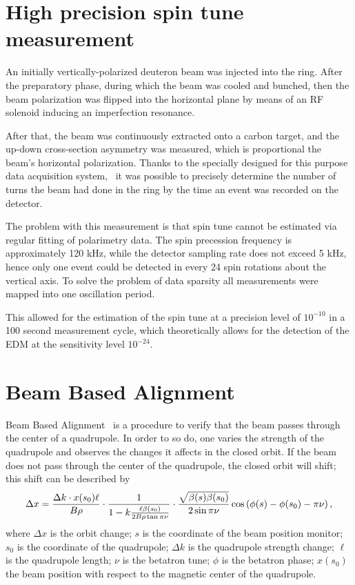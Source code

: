 

\section{High precision spin tune measurement}
An initially vertically-polarized deuteron beam was injected into the ring. After the preparatory phase, during which the beam was cooled and bunched, then the beam polarization was flipped into the horizontal plane by means of an RF solenoid inducing an imperfection resonance.~\cite[p.~7]{COSY:SpinTuneMapping}

After that, the beam was continuously extracted onto a carbon target, and the up-down cross-section asymmetry was measured, which is proportional the beam's horizontal polarization. Thanks to the specially designed for this purpose data acquisition system,~\cite{COSY:DAQ} it was possible to precisely determine the number of turns the beam had done in the ring by the time an event was recorded on the detector.

The problem with this measurement is that spin tune cannot be estimated via regular fitting of polarimetry data.
The spin precession frequency is approximately 120 kHz, while the detector sampling rate does not exceed 5 kHz, hence only one event could be detected in every 24 spin rotations about the vertical axis.
To solve the problem of data sparsity all measurements were mapped into one oscillation period.~\cite{Eversmann:SpinTuneMeasurement}

This allowed for the estimation of the spin tune at a precision level of $10^{-10}$ in a 100 second measurement cycle, which theoretically allows for the detection of the EDM at the sensitivity level $10^{-24}$\ecm.

\section{Beam Based Alignment}
\newcommand{\Nbpm}{N_{\mathrm{BPM}}}
Beam Based Alignment~\cite{Wagner:BBA2018} is a procedure to verify 
that the beam passes through the center of a quadrupole.
In order to so do, one varies the strength of the quadrupole and observes the changes it affects in the 
closed orbit. If the beam does not pass through the center of the quadrupole, the closed orbit will shift;
this shift can be described by
\[
\Delta x = \frac{\Delta k\cdot x(s_0)\ell}{B\rho}\cdot \frac{1}{1 - k\frac{\ell\beta(s_0)}{2B\rho\tan\pi\nu}}\cdot \frac{\sqrt{\beta(s)\beta(s_0)}}{2\sin\pi\nu}\cos\bkt{\phi(s) - \phi(s_0) - \pi\nu},
\]
where $\Delta x$ is the orbit change; $s$ is the coordinate of the beam position monitor; $s_0$ is the coordinate of the quadrupole; $\Delta k$ is the quadrupole strength change; $\ell$ is the quadrupole length; $\nu$ is the betatron tune; $\phi$ is the betatron phase; $x(s_0)$ the beam position with respect to the magnetic center of the quadrupole.

